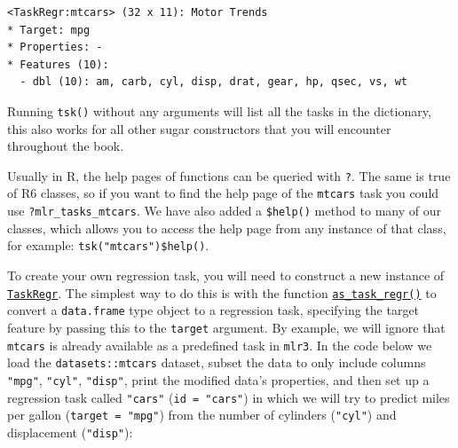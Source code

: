 \begin{Shaded}
\begin{Highlighting}[]
\OtherTok{=} \NormalTok{(}\NormalTok{)}
\end{Highlighting}
\end{Shaded}

\begin{verbatim}
<TaskRegr:mtcars> (32 x 11): Motor Trends
* Target: mpg
* Properties: -
* Features (10):
  - dbl (10): am, carb, cyl, disp, drat, gear, hp, qsec, vs, wt
\end{verbatim}

Running \texttt{tsk()} without any arguments will list all the tasks in
the dictionary, this also works for all other sugar constructors that
you will encounter throughout the book.

\begin{tcolorbox}[enhanced jigsaw, opacitybacktitle=0.6, rightrule=.15mm, opacityback=0, arc=.35mm, breakable, titlerule=0mm, colframe=quarto-callout-tip-color-frame, coltitle=black, bottomrule=.15mm, toprule=.15mm, colback=white, colbacktitle=quarto-callout-tip-color!10!white, bottomtitle=1mm, toptitle=1mm, title=\textcolor{quarto-callout-tip-color}{\faLightbulb}\hspace{0.5em}{Help Pages}, leftrule=.75mm, left=2mm]

Usually in R, the help pages of functions can be queried with
\texttt{?}. The same is true of R6 classes, so if you want to find the
help page of the \texttt{mtcars} task you could use
\texttt{?mlr\_tasks\_mtcars}. We have also added a \texttt{\$help()}
method to many of our classes, which allows you to access the help page
from any instance of that class, for example:
\texttt{tsk("mtcars")\$help()}.

\end{tcolorbox}

To create your own regression task, you will need to construct a new
instance of
\href{https://mlr3.mlr-org.com/reference/TaskRegr.html}{\texttt{TaskRegr}}.
The simplest way to do this is with the function
\href{https://mlr3.mlr-org.com/reference/as_task_regr.html}{\texttt{as\_task\_regr()}}
to convert a \texttt{data.frame} type object to a regression task,
specifying the target feature by passing this to the \texttt{target}
argument. By example, we will ignore that \texttt{mtcars} is already
available as a predefined task in \texttt{mlr3}. In the code below we
load the \texttt{datasets::mtcars} dataset, subset the data to only
include columns \texttt{"mpg"}, \texttt{"cyl"}, \texttt{"disp"}, print
the modified data's properties, and then set up a regression task called
\texttt{"cars"} (\texttt{id\ =\ "cars"}) in which we will try to predict
miles per gallon (\texttt{target\ =\ "mpg"}) from the number of
cylinders (\texttt{"cyl"}) and displacement (\texttt{"disp"}):

